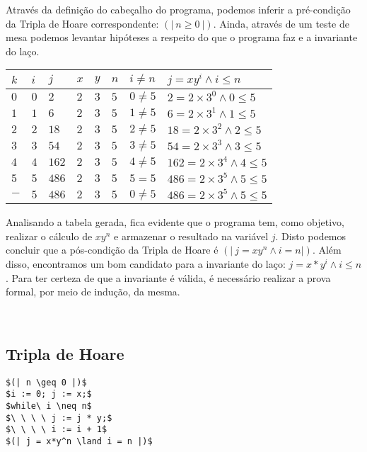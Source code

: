 \documentclass[12pt]{article}
\begin{document}
Através da definição do cabeçalho do programa, podemos inferir a pré-condição da Tripla de Hoare correspondente: $(|\ n \geq 0\ |)$. Ainda, através de um teste de
mesa podemos levantar hipóteses a respeito do que o programa faz e a invariante do laço.

\begin{table}[h]
\begin{tabular}{|l|l|l|l|l|l|l|l|}
\hline
$k$ & $i$ & $j$   & $x$ & $y$ & $n$ & $i \neq n$ & $j=xy^i \land i \leq n $ \\ \hline
$0$ & $0$ & $2$   & $2$ & $3$ & $5$ & $0 \neq 5$ & $2=2   \times 3^0 \land 0 \leq 5 $ \\ \hline
$1$ & $1$ & $6$   & $2$ & $3$ & $5$ & $1 \neq 5$ & $6=2   \times 3^1 \land 1 \leq 5 $ \\ \hline
$2$ & $2$ & $18$  & $2$ & $3$ & $5$ & $2 \neq 5$ & $18=2  \times 3^2 \land 2 \leq 5 $ \\ \hline
$3$ & $3$ & $54$  & $2$ & $3$ & $5$ & $3 \neq 5$ & $54=2  \times 3^3 \land 3 \leq 5 $ \\ \hline
$4$ & $4$ & $162$ & $2$ & $3$ & $5$ & $4 \neq 5$ & $162=2 \times 3^4 \land 4 \leq 5 $ \\ \hline
$5$ & $5$ & $486$ & $2$ & $3$ & $5$ & $5  =   5$  & $486=2 \times 3^5 \land 5 \leq 5 $ \\ \hline
$-$ & $5$ & $486$ & $2$ & $3$ & $5$ & $0 \neq 5$ & $486=2 \times 3^5 \land 5 \leq 5 $ \\ \hline
\end{tabular}
\end{table}

Analisando a tabela gerada, fica evidente que o programa tem, como objetivo,
realizar o cálculo de $xy^n$ e armazenar o resultado na variável $j$. Disto
podemos concluir que a pós-condição da Tripla de Hoare é $(|\ j = xy^n \land i = n |)$.
Além disso, encontramos um bom candidato para a invariante do laço:
$j = x * y^i \land i \leq n$. Para ter certeza de que a invariante é válida, é necessário
realizar a prova formal, por meio de indução, da mesma.

\   %

\subsection{Tripla de Hoare}

\begin{lstlisting}
$(| n \geq 0 |)$
$i := 0; j := x;$
$while\ i \neq n$
$\ \ \ \ j := j * y;$
$\ \ \ \ i := i + 1$
$(| j = x*y^n \land i = n |)$
\end{lstlisting}
\end{document}
